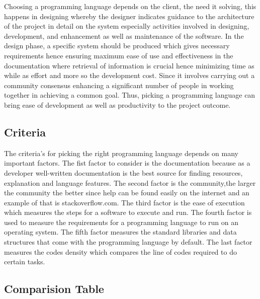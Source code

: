 \documentclass{scrreprt}
\begin{document}
Choosing a programming language depends on the client, the need it solving, this happens in designing
whereby the designer indicates guidance to the architecture of the project in detail on the system
especially activities involved in designing, development, and enhancement as well as maintenance of the
software. In the design phase, a specific system should be produced which gives necessary requirements
hence ensuring maximum ease of use and effectiveness in the documentation where retrieval of
information is crucial hence minimizing time as while as effort and more so the development cost. Since
it involves carrying out a community consensus enhancing a significant number of people in working
together in achieving a common goal. Thus, picking a programming language can bring ease of
development as well as productivity to the project outcome.

\subsection{Criteria}
The criteria’s for picking the right programming language depends on many important factors. The fist
factor to consider is the documentation because as a developer well-written documentation is the best
source for finding resources, explanation and language features. The second factor is the community,the larger the community the better since help can be found easily on the internet and an example of
that is stackoverflow.com. The third factor is the ease of execution which measures the steps for a
software to execute and run. The fourth factor is used to measure the requirements for a programming
language to run on an operating system. The fifth factor measures the standard libraries and data
structures that come with the programming language by default. The last factor measures the codes
density which compares the line of codes required to do certain tasks.

\subsection{Comparision Table}
\end{document}
